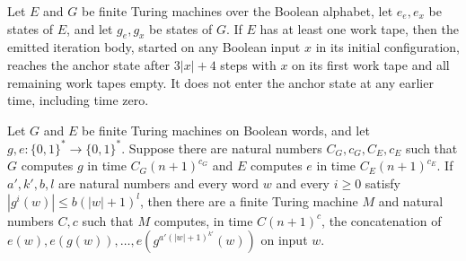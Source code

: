 \begin{theorem}
\label{Turing.body_start}
\leanok
{}
Let $E$ and $G$ be finite Turing machines over the Boolean alphabet, let $e_e,e_x$ be
states of $E$, and let $g_e,g_x$ be states of $G$. If $E$ has at least one work tape,
then the emitted iteration body, started on any Boolean input $x$ in its initial
configuration, reaches the anchor state after $3|x|+4$ steps with $x$ on its first work
tape and all remaining work tapes empty. It does not enter the anchor state at any
earlier time, including time zero.
\end{theorem}

\begin{theorem}
\label{Turing.FinTM.exists_emitIterTM}
\leanok
{}
Let $G$ and $E$ be finite Turing machines on Boolean words, and let $g,e : \{0,1\}^*
\to \{0,1\}^*$. Suppose there are natural numbers $C_G,c_G,C_E,c_E$ such that $G$
computes $g$ in time $C_G(n+1)^{c_G}$ and $E$ computes $e$ in time $C_E(n+1)^{c_E}$. If
$a',k',b,l$ are natural numbers and every word $w$ and every $i\ge 0$ satisfy
$|g^{i}(w)| \le b(|w|+1)^l$, then there are a finite Turing machine $M$ and natural
numbers $C,c$ such that $M$ computes, in time $C(n+1)^c$, the concatenation of
$e(w),e(g(w)),\ldots,e(g^{a'(|w|+1)^{k'}}(w))$ on input $w$.
\end{theorem}
